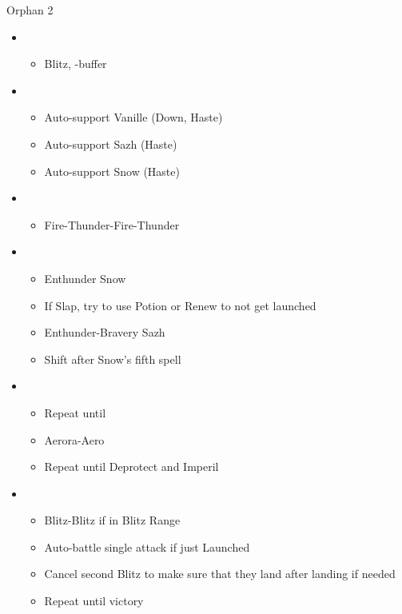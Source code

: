 \begin{battle}{Orphan 2}
\begin{multicols}{2}
\begin{itemize}
    \item \second
    \begin{itemize}
        \item Blitz, \syn-buffer
    \end{itemize}
    \item \fourth
    \begin{itemize}
        \item Auto-support Vanille (Down, Haste)
        \item Auto-support Sazh (Haste)
        \item Auto-support Snow (Haste)
    \end{itemize}
    \item \sixth
    \begin{itemize}
        \item Fire-Thunder-Fire-Thunder
    \end{itemize}
    \item \fourth
    \begin{itemize}
        \item Enthunder Snow
        \item If Slap, try to use Potion or Renew to not get launched
        \item Enthunder-Bravery Sazh
        \item Shift after Snow's fifth spell
    \end{itemize}
    \columnbreak
    \item \fifth
    \begin{itemize}
        \item Repeat until \stagger
        \item Aerora-Aero
        \item Repeat until Deprotect and Imperil
    \end{itemize}
    \item \first
    \begin{itemize}
        \item Blitz-Blitz if in Blitz Range
        \item Auto-battle single attack if just Launched
        \item Cancel second Blitz to make sure that they land after landing if needed
        \item Repeat until victory
    \end{itemize}
\end{itemize}
\end{multicols}
\end{battle}